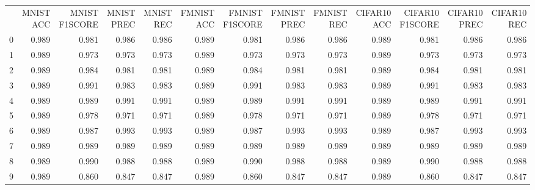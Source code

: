 \begin{tabular}{lrrrrrrrrrrrr}
 & MNIST ACC & MNIST F1SCORE & MNIST PREC & MNIST REC & FMNIST ACC & FMNIST F1SCORE & FMNIST PREC & FMNIST REC & CIFAR10 ACC & CIFAR10 F1SCORE & CIFAR10 PREC & CIFAR10 REC \\
0 & 0.989 & 0.981 & 0.986 & 0.986 & 0.989 & 0.981 & 0.986 & 0.986 & 0.989 & 0.981 & 0.986 & 0.986 \\
1 & 0.989 & 0.973 & 0.973 & 0.973 & 0.989 & 0.973 & 0.973 & 0.973 & 0.989 & 0.973 & 0.973 & 0.973 \\
2 & 0.989 & 0.984 & 0.981 & 0.981 & 0.989 & 0.984 & 0.981 & 0.981 & 0.989 & 0.984 & 0.981 & 0.981 \\
3 & 0.989 & 0.991 & 0.983 & 0.983 & 0.989 & 0.991 & 0.983 & 0.983 & 0.989 & 0.991 & 0.983 & 0.983 \\
4 & 0.989 & 0.989 & 0.991 & 0.991 & 0.989 & 0.989 & 0.991 & 0.991 & 0.989 & 0.989 & 0.991 & 0.991 \\
5 & 0.989 & 0.978 & 0.971 & 0.971 & 0.989 & 0.978 & 0.971 & 0.971 & 0.989 & 0.978 & 0.971 & 0.971 \\
6 & 0.989 & 0.987 & 0.993 & 0.993 & 0.989 & 0.987 & 0.993 & 0.993 & 0.989 & 0.987 & 0.993 & 0.993 \\
7 & 0.989 & 0.989 & 0.989 & 0.989 & 0.989 & 0.989 & 0.989 & 0.989 & 0.989 & 0.989 & 0.989 & 0.989 \\
8 & 0.989 & 0.990 & 0.988 & 0.988 & 0.989 & 0.990 & 0.988 & 0.988 & 0.989 & 0.990 & 0.988 & 0.988 \\
9 & 0.989 & 0.860 & 0.847 & 0.847 & 0.989 & 0.860 & 0.847 & 0.847 & 0.989 & 0.860 & 0.847 & 0.847 \\
\end{tabular}
